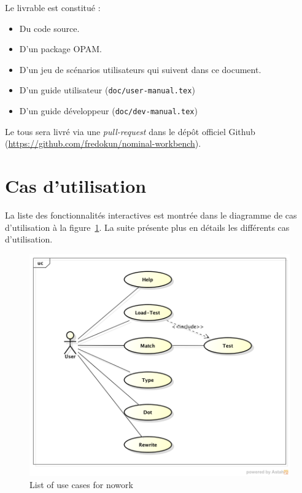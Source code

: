 \documentclass[12pt,a4paper]{article}
\begin{document}
Le livrable est constitué :
\newline

\begin{itemize}
\item Du code source.
\item D'un package OPAM.
\item D'un jeu de scénarios utilisateurs qui suivent dans ce document.
\item D'un guide utilisateur (\verb=doc/user-manual.tex=)
\item D'un guide développeur (\verb=doc/dev-manual.tex=)
\end{itemize}
\vspace{10pt}

Le tous sera livré via une \textit{pull-request} dans le dépôt officiel Github (\url{https://github.com/fredokun/nominal-workbench}).


\section{Cas d'utilisation}

La liste des fonctionnalités interactives est montrée dans le diagramme de cas
d'utilisation à la figure~\ref{use-cases}. La suite présente plus en détails les différents cas d'utilisation.

\begin{figure}[h!]
  \centering
  \includegraphics[width=\linewidth,natwidth=\linewidth,natheight=\textheight]{use-case-diagram.png}
  \caption{List of use cases for nowork}
  \label{use-cases}
\end{figure}
\end{document}
